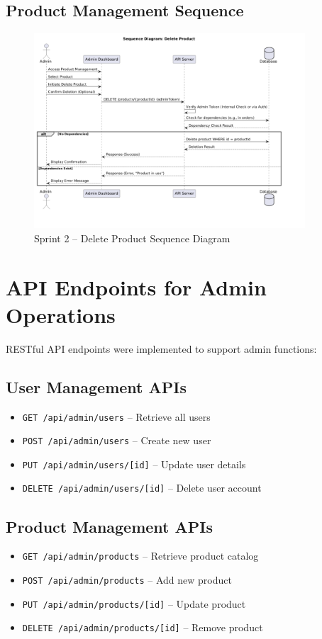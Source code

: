 \subsection{Product Management Sequence}

\begin{figure}[H]
  \centering
  \includegraphics[width=0.9\textwidth]{figures/images/sprint2sequence(delete product).png}
  \caption{Sprint 2 – Delete Product Sequence Diagram}
  \label{fig:sprint2-delete-product}
\end{figure}

\section{API Endpoints for Admin Operations}

RESTful API endpoints were implemented to support admin functions:

\subsection*{User Management APIs}
\begin{itemize}
  \item \texttt{GET /api/admin/users} – Retrieve all users
  \item \texttt{POST /api/admin/users} – Create new user
  \item \texttt{PUT /api/admin/users/[id]} – Update user details
  \item \texttt{DELETE /api/admin/users/[id]} – Delete user account
\end{itemize}

\subsection*{Product Management APIs}
\begin{itemize}
  \item \texttt{GET /api/admin/products} – Retrieve product catalog
  \item \texttt{POST /api/admin/products} – Add new product
  \item \texttt{PUT /api/admin/products/[id]} – Update product
  \item \texttt{DELETE /api/admin/products/[id]} – Remove product
\end{itemize}

